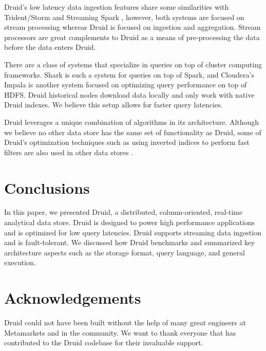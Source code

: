 \documentclass{acm_proc_article-sp}
\begin{document}
Druid's low latency data ingestion features share some similarities with
Trident/Storm \cite{marz2013storm} and Streaming Spark
\cite{zaharia2012discretized}, however, both systems are focused on stream
processing whereas Druid is focused on ingestion and aggregation. Stream
processors are great complements to Druid as a means of pre-processing the data
before the data enters Druid.

There are a class of systems that specialize in queries on top of cluster
computing frameworks.  Shark \cite{engle2012shark} is such a system for queries
on top of Spark, and Cloudera's Impala \cite{cloudera2013} is another system
focused on optimizing query performance on top of HDFS. Druid historical nodes
download data locally and only work with native Druid indexes. We believe this
setup allows for faster query latencies.

Druid leverages a unique combination of algorithms in its
architecture. Although we believe no other data store has the same set
of functionality as Druid, some of Druid’s optimization techniques such as using
inverted indices to perform fast filters are also used in other data
stores \cite{macnicol2004sybase}.

\section{Conclusions}
\label{sec:conclusions}
In this paper, we presented Druid, a distributed, column-oriented, real-time
analytical data store. Druid is designed to power high performance applications
and is optimized for low query latencies. Druid supports streaming data
ingestion and is fault-tolerant. We discussed how Druid benchmarks and
summarized key architecture aspects such
as the storage format, query language, and general execution.

\balance

\section{Acknowledgements}
\label{sec:acknowledgements}
Druid could not have been built without the help of many great engineers at
Metamarkets and in the community.  We want to thank everyone that has
contributed to the Druid codebase for their invaluable support. 




\end{document}
